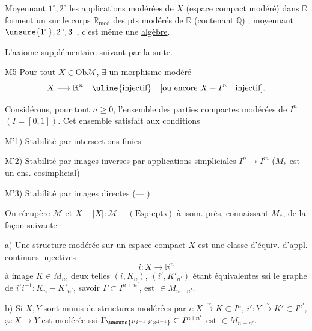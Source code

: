 Moyennant $1^\circ,2^\circ$ les applications modérées de $X$ (espace compact modéré) dans $\mathbb R$ forment un  sur le corps $\mathbb R_{\mathrm{mod}}$ des pts modérés de $\mathbb R$ (contenant $\mathbb Q$) ; moyennant $\unsure{1^\circ},2^\circ,3^\circ$, c'est même une \uline{algèbre}.

L'axiome supplémentaire suivant  par la suite.

\uline{M5} Pour tout $X\in\mathrm{Ob}\mathcal M$, $\exists$  un morphisme modéré
\[
X\longrightarrow\mathbb R^n\quad\uline{\text{injectif}}
\quad[\text{ou encore }X-I^n\quad\text{injectif}].
\]

Considérons, pour tout $n\geq0$, l'ensemble  des parties compactes modérées de $I^n$ $(I=[0,1])$. Cet ensemble  satisfait aux conditions


M'1) Stabilité par intersections finies

M'2) Stabilité par images inverses par applications  simpliciales $I^n\longrightarrow I^m$ ($M_*$ est un ens. cosimplicial)

M'3) Stabilité par images directes ($\text{---}$ )


On récupère $\mathcal M$ et $X-|X|:\mathcal M-(\text{Esp cpts})$ à isom. près, connaissant $M_*$, de la façon suivante :

a) Une structure modérée sur un espace compact $X$ est une classe d'équiv. d'appl. continues injectives
\[
i:X\longrightarrow\mathbb R^n
\]
à image $K\in M_n$, deux telles $(i,K_n)$, $(i',K'_{n'})$ étant équivalentes ssi le graphe de $i'i^{-1}:K_n-K'_{n'}$, savoir $\Gamma\subset I^{n+n'}$, est  $\in M_{n+n'}$.

b) Si $X,Y$ sont munis de structures modérées par $i:X\xrightarrow{\sim}K\subset I^n$, $i':Y\xrightarrow{\sim}K'\subset I^{n'}$, $\varphi:X\longrightarrow Y$ est modérée ssi $\Gamma_{\unsure{i'i^{-1}|i'\varphi i^{-1}}}\subset I^{n+n'}$ est $\in M_{n+n'}$.

